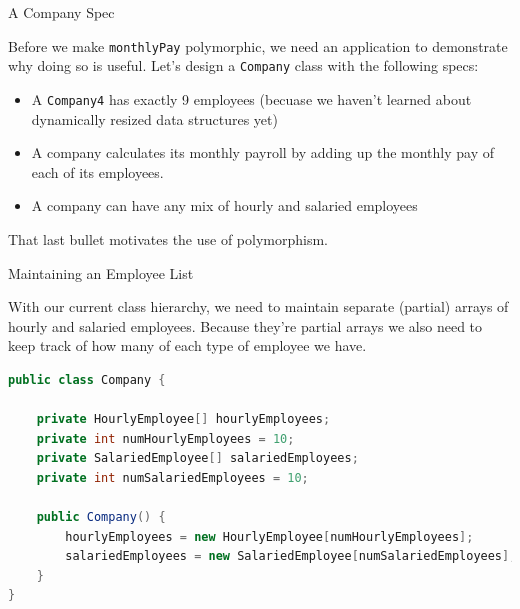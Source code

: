 \documentclass{beamer}
\begin{document}
\begin{frame}[fragile]{A Company Spec}


Before we make {\tt monthlyPay} polymorphic, we need an application to demonstrate why doing so is useful.  Let's design a {\tt Company} class with the following specs:

\begin{itemize}
\item A {\tt Company4} has exactly 9 employees (becuase we haven't learned about dynamically resized data structures yet)
\item A company calculates its monthly payroll by adding up the monthly pay of each of its employees.
\item A company can have any mix of hourly and salaried employees
\end{itemize}

That last bullet motivates the use of polymorphism.

\end{frame}

\begin{frame}[fragile]{Maintaining an Employee List}


With our current class hierarchy, we need to maintain separate (partial) arrays of hourly and salaried employees.  Because they're partial arrays we also need to keep track of how many of each type of employee we have.
\begin{lstlisting}[language=Java]
public class Company {

    private HourlyEmployee[] hourlyEmployees;
    private int numHourlyEmployees = 10;
    private SalariedEmployee[] salariedEmployees;
    private int numSalariedEmployees = 10;

    public Company() {
        hourlyEmployees = new HourlyEmployee[numHourlyEmployees];
        salariedEmployees = new SalariedEmployee[numSalariedEmployees];
    }
}
\end{lstlisting}


\end{frame}
\end{document}
